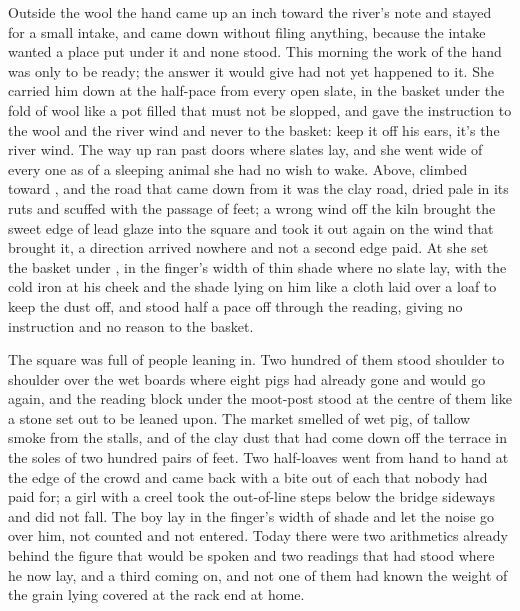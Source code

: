 Outside the wool the hand came up an inch toward the river's note and stayed for a small intake, and came down without filing anything, because the intake wanted a place put under it and none stood. This morning the work of the hand was only to be ready; the answer it would give had not yet happened to it. She carried him down at the half-pace from every open slate, in the basket under the fold of wool like a pot filled that must not be slopped, and gave the instruction to the wool and the river wind and never to the basket: keep it off his ears, it's the river wind. The way up ran past doors where slates lay, and she went wide of every one as of a sleeping animal she had no wish to wake. Above,  climbed toward , and the road that came down from it was the clay road, dried pale in its ruts and scuffed with the passage of feet; a wrong wind off the kiln brought the sweet edge of lead glaze into the square and took it out again on the wind that brought it, a direction arrived nowhere and not a second edge paid. At  she set the basket under , in the finger's width of thin shade where no slate lay, with the cold iron at his cheek and the shade lying on him like a cloth laid over a loaf to keep the dust off, and stood half a pace off through the reading, giving no instruction and no reason to the basket.

\scenebreak

The square was full of people leaning in. Two hundred of them stood shoulder to shoulder over the wet boards where eight pigs had already gone and would go again, and the reading block under the moot-post stood at the centre of them like a stone set out to be leaned upon. The market smelled of wet pig, of tallow smoke from the stalls, and of the clay dust that had come down off the terrace in the soles of two hundred pairs of feet. Two half-loaves went from hand to hand at the edge of the crowd and came back with a bite out of each that nobody had paid for; a girl with a creel took the out-of-line steps below the bridge sideways and did not fall. The boy lay in the finger's width of shade and let the noise go over him, not counted and not entered. Today there were two arithmetics already behind the figure that would be spoken and two readings that had stood where he now lay, and a third coming on, and not one of them had known the weight of the grain lying covered at the rack end at home.

